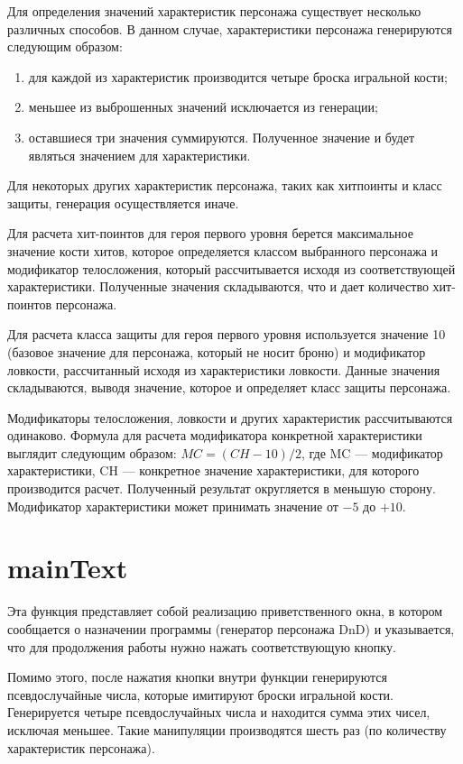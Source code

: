 \documentclass[12pt,a4paper]{article}
\begin{document}
Для определения значений характеристик персонажа существует несколько различных способов. В данном случае, характеристики персонажа генерируются следующим образом:
\begin{enumerate}
    \item для каждой из характеристик производится четыре броска игральной кости;
    
    \item меньшее из выброшенных значений исключается из генерации;
    
    \item оставшиеся три значения суммируются. Полученное значение и будет являться значением для характеристики.
\end{enumerate}

Для некоторых других характеристик персонажа, таких как хит\-поинты и класс защиты, генерация осуществляется иначе.

Для расчета хит-поинтов для героя первого уровня берется максимальное значение кости хитов, которое определяется классом выбранного персонажа и модификатор телосложения, который рассчитывается исходя из соответствующей характеристики. Полученные значения складываются, что и дает количество хит-поинтов персонажа.

Для расчета класса защиты для героя первого уровня используется значение 10 (базовое значение для персонажа, который не носит броню) и модификатор ловкости, рассчитанный исходя из характеристики ловкости. Данные значения складываются, выводя значение, которое и определяет класс защиты персонажа.

Модификаторы телосложения, ловкости и других характеристик рассчитываются одинаково. Формула для расчета модификатора конкретной характеристики выглядит следующим образом: $MC = (CH - 10) / 2$, где MC --- модификатор характеристики, CH --- конкретное значение характеристики, для которого производится расчет. Полученный результат округляется в меньшую сторону. Модификатор характеристики может принимать значение от $-5$ до $+10$.

\section{mainText}

Эта функция представляет собой реализацию приветственного окна, в котором сообщается о назначении программы (генератор персонажа DnD) и указывается, что для продолжения работы нужно нажать соответствующую кнопку.

Помимо этого, после нажатия кнопки внутри функции генерируются псевдослучайные числа, которые имитируют броски игральной кости. Генерируется четыре псевдослучайных числа и находится сумма этих чисел, исключая меньшее. Такие манипуляции производятся шесть раз (по количеству характеристик персонажа).
\end{document}
